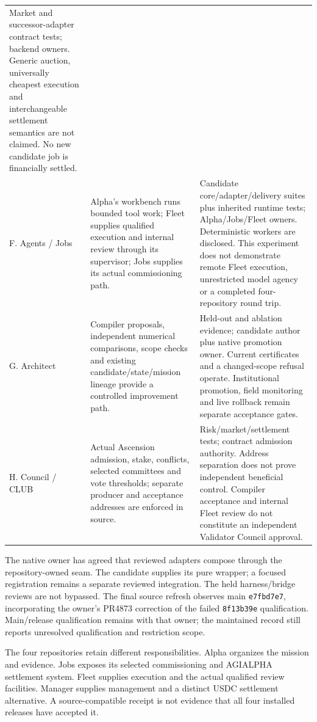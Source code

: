 \documentclass[11pt,letterpaper]{article}
\theoremstyle{definition}\newtheorem{definition}[theorem]{Definition}
\theoremstyle{remark}\newtheorem{remark}[theorem]{Remark}
\begin{document}
\begin{longtable}{@{}P{.15\linewidth}P{.39\linewidth}P{.40\linewidth}@{}}
Market and successor-adapter contract tests; backend owners. Generic auction, universally cheapest execution and interchangeable settlement semantics are not claimed. No new candidate job is financially settled. \\[.3em]
F. Agents / Jobs &
Alpha's workbench runs bounded tool work; Fleet supplies qualified execution and internal review through its supervisor; Jobs supplies its actual commissioning path. &
Candidate core/adapter/delivery suites plus inherited runtime tests; Alpha/Jobs/Fleet owners. Deterministic workers are disclosed. This experiment does not demonstrate remote Fleet execution, unrestricted model agency or a completed four-repository round trip. \\[.3em]
G. Architect &
Compiler proposals, independent numerical comparisons, scope checks and existing candidate/state/mission lineage provide a controlled improvement path. &
Held-out and ablation evidence; candidate author plus native promotion owner. Current certificates and a changed-scope refusal operate. Institutional promotion, field monitoring and live rollback remain separate acceptance gates. \\[.3em]
H. Council / CLUB &
Actual Ascension admission, stake, conflicts, selected committees and vote thresholds; separate producer and acceptance addresses are enforced in source. &
Risk/market/settlement tests; contract admission authority. Address separation does not prove independent beneficial control. Compiler acceptance and internal Fleet review do not constitute an independent Validator Council approval. \\
\bottomrule
\end{longtable}

The native owner has agreed that reviewed adapters compose through the repository-owned  seam. The candidate supplies its pure wrapper; a focused registration remains a separate reviewed integration. The held harness/bridge reviews are not bypassed. The final source refresh observes main \texttt{e7fbd7e7}, incorporating the owner's PR4873 correction of the failed \texttt{8f13b39e} qualification. Main/release qualification remains with that owner; the maintained record still reports unresolved qualification and restriction scope.\par

The four repositories retain different responsibilities. Alpha organizes the mission and evidence. Jobs exposes its selected commissioning and AGIALPHA settlement system. Fleet supplies execution and the actual qualified review facilities. Manager supplies management and a distinct USDC settlement alternative. A source-compatible receipt is not evidence that all four installed releases have accepted it.
\end{document}
